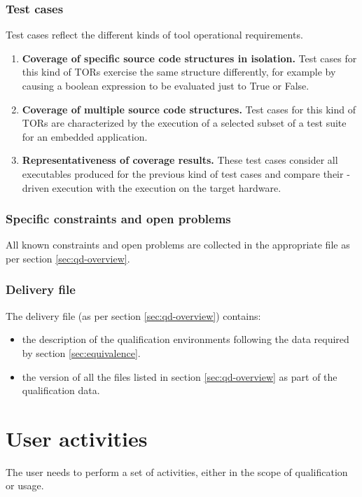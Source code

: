 \documentclass {report}
\begin{document}
\subsection{Test cases}
Test cases reflect the different kinds of tool operational requirements.
\begin{enumerate}

\item \textbf{Coverage of specific source code structures in isolation.} Test cases for this kind of TORs exercise the same structure differently, for example by causing a boolean expression to be evaluated just to True or False.

\item \textbf{Coverage of multiple source code structures.} Test cases for this kind of TORs are characterized by the execution of a selected subset of a test suite for an embedded application. 

\item \textbf{Representativeness of coverage results.} These test cases consider all executables produced for the previous kind of test cases and compare their \xcov-driven execution with the execution on the target hardware. 

\end{enumerate}

\subsection{Specific constraints and open problems}
\label{sec:constr-problems}
All known constraints and open problems are collected in the appropriate file as per section \ref{sec:qd-overview}.

\subsection{Delivery file}
\label{sec:delivery}
The delivery file (as per section \ref{sec:qd-overview}) contains:
\begin{itemize} 
\item the description of the qualification environments following the data required by section \ref{sec:equivalence}.
\item the version of all the files listed in section \ref{sec:qd-overview} as part of the qualification data.
\end{itemize}

\chapter{User activities}
\label{sec:user-act}
The user needs to perform a set of activities, either in the scope of \xcov qualification or \xcov usage.
\end{document}

